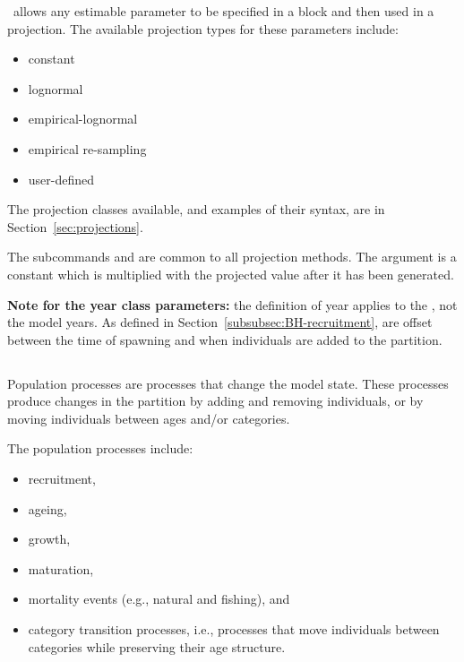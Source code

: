 \CNAME\ allows any estimable parameter to be specified in a  block and then used in a projection. The available projection types for these parameters include:

\begin{itemize}
	\item constant
	\item lognormal
	\item empirical-lognormal
	\item empirical re-sampling
	\item user-defined
\end{itemize}

The projection classes available, and examples of their syntax, are in  Section~\ref{sec:projections}.

The subcommands  and  are common to all projection methods. The argument  is a constant which is multiplied with the projected value after it has been generated.

\textbf{Note for the year class parameters:} the definition of year applies to the , not the model years. As defined in Section~\ref{subsubsec:BH-recruitment},  are offset between the time of spawning and when individuals are added to the partition.

\subsection{}

Population processes are processes that change the model state. These processes produce changes in the partition by adding and removing individuals, or by moving individuals between ages and/or categories.

The population processes include:

\begin{itemize}
\item recruitment,
\item ageing,
\item growth,
\item maturation,
\item mortality events (e.g., natural and fishing), and
\item category transition processes, i.e., processes that move individuals between categories while preserving their age structure.
\end{itemize}

